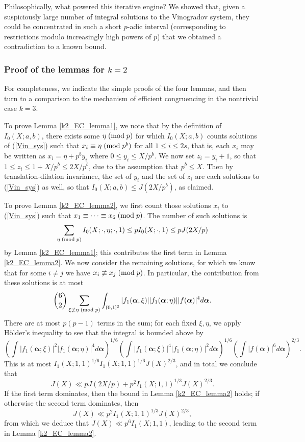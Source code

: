 \documentclass[brochure,english,12pt]{bourbaki}%
\newcommand{\albf}{\boldsymbol\alpha}
\begin{document}
Philosophically, what powered this iterative engine? We showed that, given a suspiciously large number of integral solutions to the Vinogradov system, they could be concentrated in such a short $p$-adic interval (corresponding to restrictions modulo increasingly high powers of $p$) that we obtained a contradiction to a known bound.


\subsubsection{Proof of the lemmas for $k=2$}
For completeness, we indicate the simple proofs of the four lemmas, and then turn to a comparison to the mechanism of efficient congruencing in the nontrivial case $k=3$.

To prove Lemma \ref{k2_EC_lemma1}, we note that by the definition of $I_0(X;a,b)$, there exists some $\eta \; ( \text{mod} \; p)$ for which $I_0(X;a,b)$ counts solutions of (\ref{Vin_sys}) such that $x_i \equiv \eta \; ( \text{mod} \; p^b)$ for all $1 \leq i \leq 2s$, that is, each $x_i$ may be written as $x_i = \eta + p^b y_i$ where $0 \leq y_i \leq X/p^b$. We now set $z_i = y_i + 1$, so that $1 \leq z_i \leq 1+X/p^b \leq 2X/p^b$, due to the assumption that $p^b \leq X$. Then by translation-dilation invariance, the set of $y_i$ and the set of $z_i$ are each solutions to (\ref{Vin_sys}) as well, so that $I_0(X;a,b) \leq J(2X/p^b)$, as claimed.

To prove Lemma \ref{k2_EC_lemma2}, we first count those solutions $x_i$ to (\ref{Vin_sys}) such that $x_1 \equiv \cdots \equiv x_6 \; ( \text{mod} \; p)$. The number of such solutions is 
\[ \sum_{\eta \; ( \text{mod} \; p)} I_0(X;\cdot,\eta; \cdot,1) \leq p I_0(X;\cdot,1) \leq p J(2X/p) \]
by Lemma \ref{k2_EC_lemma1}; this contributes the first term in Lemma \ref{k2_EC_lemma2}.
We now consider the remaining solutions, for which we know that for some $i\neq j$ we have $x_i \not\equiv x_j \; ( \text{mod} \; p)$. In particular, the contribution from these solutions is at most 
\[ \binom{6}{2}\sum_{\xi \not\con \eta \modd{p}} \int_{(0,1]^2} |f_1(\albf,\xi)| |f_1(\albf;\eta)| |f(\albf)|^4 d\albf.\]
There are at most $p(p-1)$ terms in the sum; for each fixed $\xi,\eta$, we apply H\"{o}lder's inequality to see that 
the integral is bounded above by
\[ ( \int |f_1(\albf;\xi)|^2 |f_1(\albf;\eta)|^4 d\albf )^{1/6}
		 ( \int |f_1(\albf;\xi)|^4 |f_1(\albf;\eta)|^2 d\albf )^{1/6}
		 (\int |f(\albf)|^6 d\albf)^{2/3}.
		\]
This is at most $I_1(X;1,1)^{1/6}I_1(X;1,1)^{1/6}J(X)^{2/3}$, and in total we conclude that 
\[ J(X) \ll pJ(2X/p) + p^2I_1(X;1,1)^{1/3}J(X)^{2/3}.\]
If the first term dominates, then the bound in Lemma \ref{k2_EC_lemma2} holds; if otherwise the second term dominates, then
\[ J(X) \ll p^2I_1(X;1,1)^{1/3}J(X)^{2/3},\]
from which we deduce that $J(X) \ll p^6I_1(X;1,1)$, leading to the second term in Lemma \ref{k2_EC_lemma2}.
\end{document}

